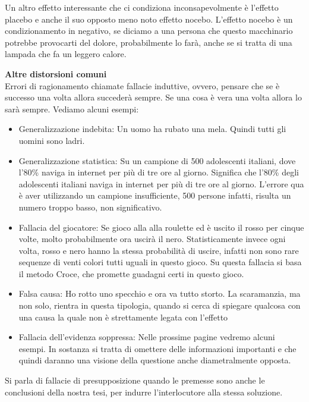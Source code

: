 \documentclass[12pt]{book} %
\begin{document}
Un altro effetto interessante che ci condiziona inconsapevolmente è l'effetto placebo e anche il
suo opposto meno noto effetto nocebo. L'effetto nocebo è un condizionamento in negativo, se
diciamo a una persona che questo macchinario potrebbe provocarti del dolore, probabilmente lo farà, anche se si tratta
di una lampada che fa un leggero calore.


\bigskip

\noindent \textbf{\large Altre distorsioni comuni} \\
Errori di ragionamento chiamate fallacie induttive, ovvero, pensare che se è successo una volta allora succederà sempre.
Se una cosa è vera una volta allora lo sarà sempre. Vediamo alcuni esempi:

\begin{itemize}
\item Generalizzazione indebita: Un uomo ha rubato una mela. Quindi tutti gli uomini sono ladri.
\item Generalizzazione statistica: Su un campione di 500 adolescenti italiani, dove l'80\% naviga in internet per più di
tre ore al giorno. Significa che l'80\% degli adolescenti italiani naviga in internet per più di tre ore al giorno.
L'errore qua è aver utilizzando un campione insufficiente, 500 persone infatti, risulta un numero
troppo basso, non significativo.
\item Fallacia del giocatore: Se gioco alla alla roulette ed è uscito il rosso per cinque volte, molto probabilmente ora
uscirà il nero. Statisticamente invece ogni volta, rosso e nero hanno la stessa probabilità di uscire, infatti non sono
rare sequenze di venti colori tutti uguali in questo gioco. Su questa fallacia si basa il metodo Croce, che promette
guadagni certi in questo gioco.
\item Falsa causa: Ho rotto uno specchio e ora va tutto storto. La scaramanzia, ma non solo, rientra in questa
tipologia, quando si cerca di spiegare qualcosa con una causa la quale non è strettamente legata con
l'effetto
\item Fallacia dell'evidenza soppressa: Nelle prossime pagine vedremo alcuni esempi. In sostanza si tratta di omettere
delle informazioni importanti e che quindi daranno una visione della questione anche diametralmente opposta.
\end{itemize}

\bigskip

Si parla di fallacie di presupposizione quando le premesse sono anche le conclusioni della nostra tesi, per indurre
l'interlocutore alla stessa soluzione.
\end{document}
